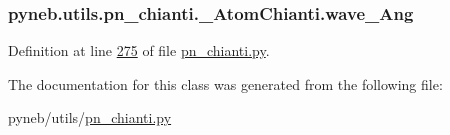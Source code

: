 \subsubsection[{wave\+\_\+\+Ang}]{\setlength{\rightskip}{0pt plus 5cm}pyneb.\+utils.\+pn\+\_\+chianti.\+\_\+\+Atom\+Chianti.\+wave\+\_\+\+Ang}\label{classpyneb_1_1utils_1_1pn__chianti_1_1___atom_chianti_aca46b2e32f9bc1412824ea3998fbe97f}


Definition at line \hyperlink{pn__chianti_8py_source_l00275}{275} of file \hyperlink{pn__chianti_8py_source}{pn\+\_\+chianti.\+py}.



The documentation for this class was generated from the following file\+:\begin{DoxyCompactItemize}
\item 
pyneb/utils/\hyperlink{pn__chianti_8py}{pn\+\_\+chianti.\+py}\end{DoxyCompactItemize}
